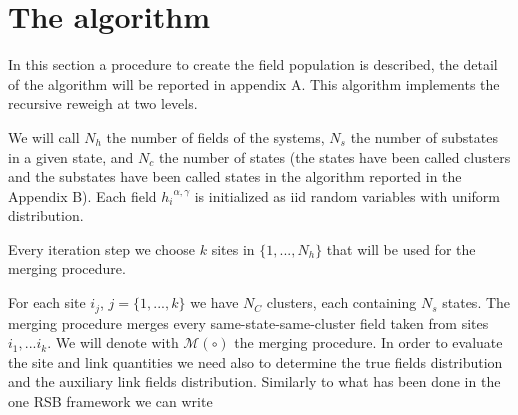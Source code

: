 \section{The algorithm}

In this section a procedure to create the field population is described, the detail of the algorithm will be reported in appendix A.
This algorithm implements the recursive reweigh at two levels.

We will call $N_h$ the number of fields of the systems, $N_s$ the number of substates in a given state, and $N_c$ the number of states (the states have been called clusters and the substates have been called states in the algorithm reported in the Appendix B).
Each field ${h_i}^{\alpha,\gamma}$ is initialized as iid random variables with uniform distribution.

Every iteration step we choose $k$ sites in $\{1,...,N_h\}$ that will be used for the merging procedure.

For each site $i_j$, $j=\{1,...,k\}$ we have $N_C$ clusters, each containing $N_s$ states. The merging procedure merges every same-state-same-cluster field taken from sites $i_1,...i_k$.
We will denote with $\mathcal{M}(\circ)$ the merging procedure. In order to evaluate the site and link quantities we need also to determine the true fields distribution and the auxiliary link fields distribution. Similarly to what has been done in the one RSB framework we can write

